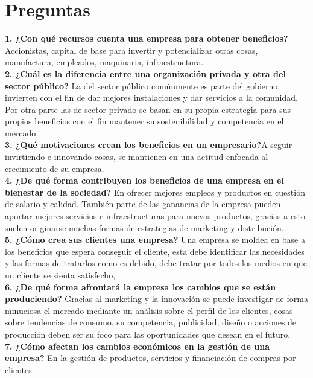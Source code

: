 \documentclass[letterpaper,12pt]{article}
\begin{document}
\begin{sloppypar}
\section*{Preguntas}
\textbf{1. ¿Con qué recursos cuenta una empresa para obtener beneficios?} Accionistas, capital de base para invertir y potencializar otras cosas, manufactura, empleados, maquinaria, infraestructura. 
\vspace{0.3cm}\\
\textbf{2. ¿Cuál es la diferencia entre una organización privada y otra del sector público?} La del sector público comúnmente es parte del gobierno, invierten con el fin de dar mejores instalaciones y dar servicios a la comunidad.  Por otra parte las de sector privado se basan en su propia estrategia para sus propios beneficios con el fin mantener su sostenibilidad y competencia en el mercado 
\vspace{0.3cm}\\
\textbf{3. ¿Qué motivaciones crean los beneficios en un empresario?}A seguir invirtiendo e innovando cosas, se mantienen en una actitud enfocada al crecimiento de su empresa. 
\vspace{0.3cm}\\
\textbf{4. ¿De qué forma contribuyen los beneficios de una empresa en el bienestar de la sociedad? } En ofrecer mejores empleos y productos en cuestión de salario y calidad. También parte de las ganancias de la empresa pueden aportar mejores servicios e infraestructuras para nuevos productos, gracias a esto suelen originarse muchas formas de estrategias de marketing y distribución.
\vspace{0.3cm}\\ 
\textbf{5. ¿Cómo crea sus clientes una empresa?} Una empresa se moldea en base a los beneficios que espera conseguir el cliente, esta debe identificar las necesidades y las formas de tratarlos como es debido, debe tratar por todos los medios en que un cliente se sienta satisfecho, 
\vspace{0.3cm}\\ 
\textbf{6. ¿De qué forma afrontará la empresa los cambios que se están produciendo?} Gracias al marketing y la innovación se puede investigar de forma minuciosa el mercado mediante un análisis sobre el perfil de los clientes, cosas sobre tendencias de consumo, su competencia, publicidad, diseño o acciones de producción deben ser su foco para las oportunidades que desean en el futuro. 
\vspace{0.3cm}\\ 
\textbf{7. ¿Cómo afectan los cambios económicos en la gestión de una empresa? } En la gestión de productos, servicios y financiación de compras por clientes.

\end{sloppypar}
\end{document}
